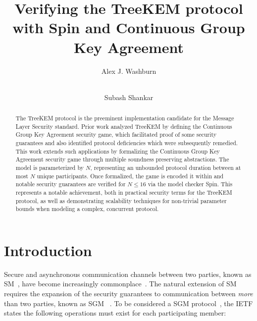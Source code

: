 \documentclass[runningheads]{llncs}
\newcommand{\Abrev}[1]{\gls{#1}}
\begin{document}
%
\title{Verifying the TreeKEM protocol with Spin and Continuous Group Key Agreement}
%
%
\author{Alex J. Washburn \and\\
Subash Shankar}
%
%

%
%
\maketitle              %
%
\begin{abstract}
The TreeKEM protocol is the preeminent implementation candidate for the Message Layer Security standard.
Prior work analyzed TreeKEM by defining the Continuous Group Key Agreement security game,
which facilitated proof of some security guarantees and also identified protocol deficiencies which were subsequently remedied.
This work extends such applications by formalizing the Continuous Group Key Agreement security game through multiple soundness preserving abstractions.
The model is parameterized by $N$, representing an unbounded protocol duration between at most $N$ unique participants.
Once formalized, the game is encoded it within \Promela and notable security guarantees are verified for $N \le 16$ via the model checker Spin.
This represents a notable achievement, both in practical security terms for the TreeKEM protocol, as well as demonstrating scalability techniques for non-trivial parameter bounds when modeling a complex, concurrent protocol.

\end{abstract}



%
%
%
\section{Introduction}

Secure and asynchronous communication channels between two parties, known as \Abrev{SM}~\cite{unger2015sok}, have become increasingly commonplace~\cite{schroder2016signal,vaziripour2017you,jahn2018usability}.
The natural extension of \Abrev{SM} requires the expansion of the security guarantees to communication between \emph{more} than two parties, known as \Abrev{SGM} ~\cite{cohn2018ends}.
To be considered a \Abrev{SGM} protocol~\cite{ietf-mls-protocol-14}, the \Abrev{IETF} states the following operations must exist for each participating member:
\end{document}
